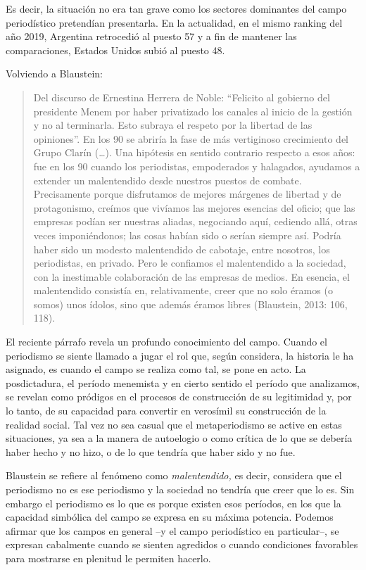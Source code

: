 Es decir, la situación no era tan grave como los sectores dominantes del campo periodístico pretendían presentarla. En la actualidad, en el mismo ranking del año 2019, Argentina retrocedió al puesto 57 y a fin de mantener las comparaciones, Estados Unidos subió al puesto 48.

Volviendo a Blaustein:

\begin{quote}
Del discurso de Ernestina Herrera de Noble: \enquote{Felicito al gobierno del presidente Menem por haber privatizado los canales al inicio de la gestión y no al terminarla. Esto subraya el respeto por la libertad de las opiniones}. En los 90 se abriría la fase de más vertiginoso crecimiento del Grupo Clarín (\ldots). Una hipótesis en sentido contrario respecto a esos años: fue en los 90 cuando los periodistas, empoderados y halagados, ayudamos a extender un malentendido desde nuestros puestos de combate. Precisamente porque disfrutamos de mejores márgenes de libertad y de protagonismo, creímos que vivíamos las mejores esencias del oficio; que las empresas podían ser nuestras aliadas, negociando aquí, cediendo allá, otras veces imponiéndonos; las cosas habían sido o serían siempre así. Podría haber sido un modesto malentendido de cabotaje, entre nosotros, los periodistas, en privado. Pero le confiamos el malentendido a la sociedad, con la inestimable colaboración de las empresas de medios. En esencia, el malentendido consistía en, relativamente, creer que no solo éramos (o somos) unos ídolos, sino que además éramos libres (Blaustein, 2013: 106, 118).
\end{quote}

El reciente párrafo revela un profundo conocimiento del campo. Cuando el periodismo se siente llamado a jugar el rol que, según considera, la historia le ha asignado, es cuando el campo se realiza como tal, se pone en acto. La posdictadura, el período menemista y en cierto sentido el período que analizamos, se revelan como pródigos en el procesos de construcción de su legitimidad y, por lo tanto, de su capacidad para convertir en verosímil su construcción de la realidad social. Tal vez no sea casual que el metaperiodismo se active en estas situaciones, ya sea a la manera de autoelogio o como crítica de lo que se debería haber hecho y no hizo, o de lo que tendría que haber sido y no fue.

Blaustein se refiere al fenómeno como \emph{malentendido,} es decir, considera que el periodismo no es ese periodismo y la sociedad no tendría que creer que lo es. Sin embargo el periodismo es lo que es porque existen esos períodos, en los que la capacidad simbólica del campo se expresa en su máxima potencia. Podemos afirmar que los campos en general --y el campo periodístico en particular--, se expresan cabalmente cuando se sienten agredidos o cuando condiciones favorables para mostrarse en plenitud le permiten hacerlo.

